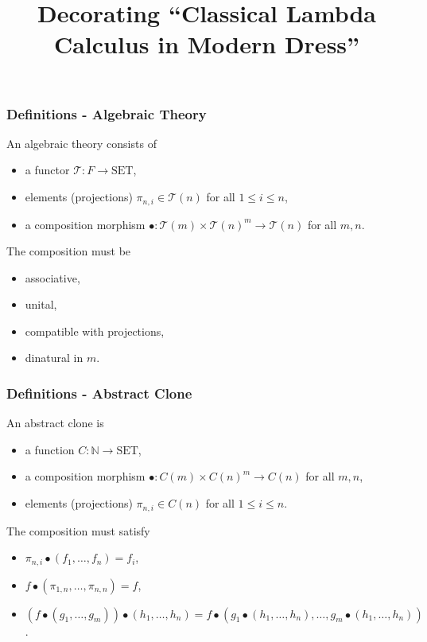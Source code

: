 \documentclass[aspectratio=169]{fancyslides} %
\title{Decorating ``Classical Lambda Calculus in Modern Dress''}
\begin{document}
  \maketitle

  \begin{frame}
    \frametitle{Definitions - Algebraic Theory}

    \begin{definition}
      An algebraic theory consists of
      \begin{itemize}
        \item a functor $ \mathcal T: F \to \mathrm{SET} $,
        \item elements (projections) $ \pi_{n, i} \in \mathcal T(n) $ for all $ 1 \leq i \leq n $,
        \item a composition morphism $ \bullet: \mathcal T(m) \times \mathcal T(n)^m \to \mathcal T(n) $ for all $ m, n $.
      \end{itemize}
      The composition must be
      \begin{itemize}
        \item associative,
        \item unital,
        \item compatible with projections,
        \item dinatural in $ m $.
      \end{itemize}
    \end{definition}
  \end{frame}

  \begin{frame}
    \frametitle{Definitions - Abstract Clone}

    \begin{definition}
      An abstract clone is
      \begin{itemize}
        \item a function $ C : \mathbb N \to \mathrm{SET} $,
        \item a composition morphism $ \bullet: C(m) \times C(n)^m \to C(n) $ for all $ m, n $,
        \item elements (projections) $ \pi_{n, i} \in C(n) $ for all $ 1 \leq i \leq n $.
      \end{itemize}
      The composition must satisfy
      \begin{itemize}
        \item $ \pi_{n, i} \bullet (f_1, \dots, f_n) = f_i $,
        \item $ f \bullet (\pi_{1, n}, \dots, \pi_{n, n}) = f $,
        \item $ (f \bullet (g_1, \dots, g_m)) \bullet (h_1, \dots, h_n) = f \bullet (g_1 \bullet (h_1, \dots, h_n), \dots, g_m \bullet (h_1, \dots, h_n)) $.
      \end{itemize}
    \end{definition}
  \end{frame}
\end{document}
